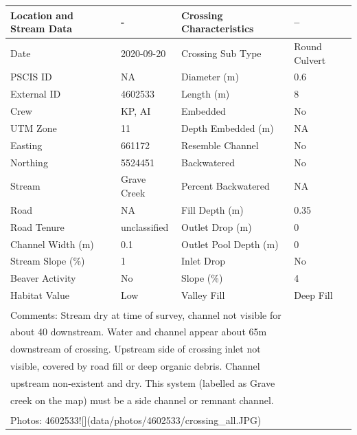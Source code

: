 \documentclass[
]{book}
\begin{document}
\begin{tabular}{llll}
\toprule
Location and Stream Data & - & Crossing Characteristics & --\\
\midrule
Date & 2020-09-20 & Crossing Sub Type & Round Culvert\\
PSCIS ID & NA & Diameter (m) & 0.6\\
External ID & 4602533 & Length (m) & 8\\
Crew & KP, AI & Embedded & No\\
UTM Zone & 11 & Depth Embedded (m) & NA\\
\addlinespace
Easting & 661172 & Resemble Channel & No\\
Northing & 5524451 & Backwatered & No\\
Stream & Grave Creek & Percent Backwatered & NA\\
Road & NA & Fill Depth (m) & 0.35\\
Road Tenure & unclassified & Outlet Drop (m) & 0\\
\addlinespace
Channel Width (m) & 0.1 & Outlet Pool Depth (m) & 0\\
Stream Slope (\%) & 1 & Inlet Drop & No\\
Beaver Activity & No & Slope (\%) & 4\\
Habitat Value & Low & Valley Fill & Deep Fill\\
\bottomrule
\multicolumn{4}{l}{\textsuperscript{} Comments: Stream dry at time of survey, channel not visible for}\\
\multicolumn{4}{l}{about 40 downstream. Water and channel appear about 65m}\\
\multicolumn{4}{l}{downstream of crossing. Upstream side of crossing inlet not}\\
\multicolumn{4}{l}{visible, covered by road fill or deep organic debris. Channel}\\
\multicolumn{4}{l}{upstream non-existent and dry. This system (labelled as Grave}\\
\multicolumn{4}{l}{creek on the map) must be a side channel or remnant channel.}\\
\multicolumn{4}{l}{\textsuperscript{} Photos: 4602533![](data/photos/4602533/crossing\_all.JPG)}\\
\end{tabular}
\end{document}
